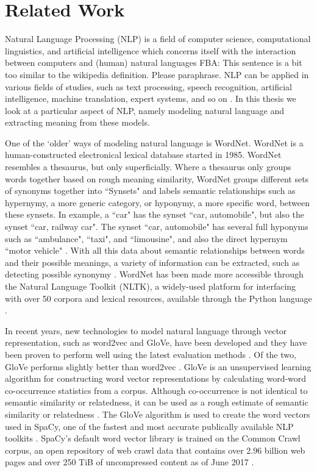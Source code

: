 \documentclass{article}
\newcommand\fba[1]{\textcolor{SeaGreen3}{FBA: #1}}
\begin{document}
\section{Related Work} \label{sec:relwork}

Natural Language Processing (NLP) is a field of computer science, computational linguistics, and artificial intelligence which concerns itself with the interaction between computers and (human) natural languages \fba{This sentence is a bit too similar to the wikipedia definition. Please paraphrase}. NLP can be applied in various fields of studies, such as text processing, speech recognition, artificial intelligence, machine translation, expert systems, and so on \citep{chowdhury2003natural}. In this thesis we look at a particular aspect of NLP, namely modeling natural language and extracting meaning from these models.

One of the `older' ways of modeling natural language is WordNet. WordNet is a human-constructed electronical lexical database started in 1985. WordNet resembles a thesaurus, but only superficially. Where a thesaurus only groups words together based on rough meaning similarity, WordNet groups different sets of synonyms together into ``Synsets" and labels semantic relationships such as hypernymy, a more generic category, or hyponymy, a more specific word, between these synsets. In example, a ``car" has the synset ``car, automobile", but also the synset ``car, railway car". The synset ``car, automobile" has several full hyponyms such as ``ambulance", ``taxi", and ``limousine", and also the direct hypernym ``motor vehicle" \cite{princeton2010wordnet}. With all this data about semantic relationships between words and their possible meanings, a variety of information can be extracted, such as detecting possible synonymy \cite{kilgarriff2000wordnet}.
WordNet has been made more accessible through the Natural Language Toolkit (NLTK), a widely-used platform for interfacing with over 50 corpora and lexical resources, available through the Python language \cite{bird2006nltk}.

In recent years, new technologies to model natural language through vector representation, such as word2vec and GloVe, have been developed \citep{mikolov2013efficient, pennington2014glove} and they have been proven to perform well using the latest evaluation methods \citep{schnabel2015evaluation}. Of the two, GloVe performs slightly better than word2vec \citep{lee2016combining}.
GloVe is an unsupervised learning algorithm for constructing word vector representations by calculating word-word co-occurrence statistics from a corpus. Although co-occurrence is not identical to semantic similarity or relatedness, it can be used as a rough estimate of semantic similarity or relatedness \citep{levy2015improving}. The GloVe algorithm is used to create the word vectors used in SpaCy, one of the fastest and most accurate publically available NLP toolkits \citep{choi2015depends}. SpaCy's default word vector library is trained on the Common Crawl corpus, an open repository of web crawl data that contains over 2.96 billion web pages and over 250 TiB of uncompressed content as of June 2017 \citep{nagel2017commoncrawl}.
\end{document}
